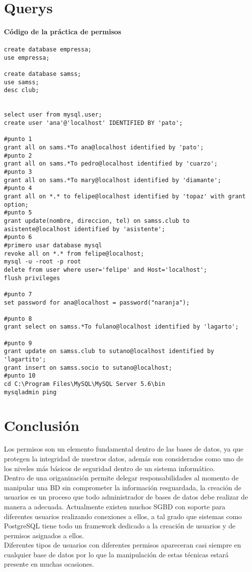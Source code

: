 \documentclass[12pt,a4paper]{article}
\begin{document}
\section{Querys}
\paragraph*{Código de la práctica de permisos}
\begin{verbatim}
create database empressa;
use empressa;

create database samss;
use samss;
desc club;


select user from mysql.user;
create user 'ana'@'localhost' IDENTIFIED BY 'pato';

#punto 1
grant all on sams.*To ana@localhost identified by 'pato';
#punto 2
grant all on sams.*To pedro@localhost identified by 'cuarzo';
#punto 3
grant all on sams.*To mary@localhost identified by 'diamante';
#punto 4
grant all on *.* to felipe@localhost identified by 'topaz' with grant option;
#punto 5
grant update(nombre, direccion, tel) on samss.club to asistente@localhost identified by 'asistente';
#punto 6
#primero usar database mysql
revoke all on *.* from felipe@localhost;
mysql -u -root -p root
delete from user where user='felipe' and Host='localhost';
flush privileges

#punto 7
set password for ana@localhost = password("naranja");

#punto 8
grant select on samss.*To fulano@localhost identified by 'lagarto';

#punto 9
grant update on samss.club to sutano@localhost identified by 'lagartito';
grant insert on samss.socio to sutano@localhost;
#punto 10
cd C:\Program Files\MySQL\MySQL Server 5.6\bin
mysqladmin ping

\end{verbatim}

\section{Conclusión}
\paragraph*{}
Los permisos son un elemento fundamental dentro de las bases de datos, ya que protegen la integridad de nuestros datos, además son considerados como uno de los niveles más básicos de seguridad dentro de un sistema informático.\\
Dentro de una origanización permite delegar responsabilidades al momento de manipular una BD sin comprometer la información resguardada, la creación de usuarios es un proceso que todo administrador de bases de datos debe realizar de manera a adecuada. Actualmente existen muchos SGBD con soporte para diferentes usuarios realizando conexiones a ellos, a tal grado que sistemas como PostgreSQL tiene todo un framework dedicado a la creación de usuarios y de permisos asignados a ellos.\\
Diferentes tipos de usuarios con diferentes permisos apareceran casi siempre en cualquier base de datos por lo que la manipulación de estas técnicas estará presente en muchas ocasiones.
\end{document}
